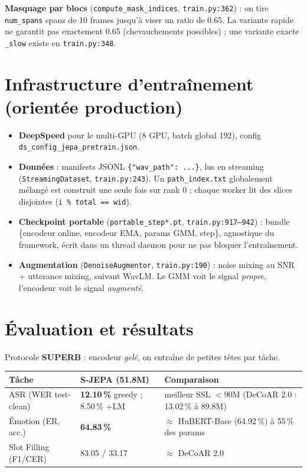 \documentclass[11pt,a4paper]{article}
\newcommand{\code}[1]{\texttt{#1}}
\newcommand{\file}[1]{\texttt{#1}}
\begin{document}
\textbf{Masquage par blocs} (\code{compute\_mask\_indices},
\file{train.py:362}) : on tire \code{num\_spans} spans de 10 frames jusqu'à
viser un ratio de 0.65. La variante rapide ne garantit pas exactement
0.65 (chevauchements possibles) ; une variante exacte \code{\_slow} existe
en \file{train.py:348}.

\section{Infrastructure d'entraînement (orientée production)}

\begin{itemize}[leftmargin=*]
  \item \textbf{DeepSpeed} pour le multi-GPU (8 GPU, batch global 192),
  config \file{ds\_config\_jepa\_pretrain.json}.
  \item \textbf{Données} : manifests JSONL \code{\{"wav\_path": ...\}}, lus en
  streaming (\code{StreamingDataset}, \file{train.py:243}). Un
  \file{path\_index.txt} globalement mélangé est construit une seule fois sur
  rank 0 ; chaque worker lit des slices disjointes (\code{i \% total == wid}).
  \item \textbf{Checkpoint portable} (\file{portable\_step*.pt},
  \file{train.py:917--942}) : bundle \{encodeur online, encodeur EMA, params
  GMM, step\}, agnostique du framework, écrit dans un thread daemon pour ne
  pas bloquer l'entraînement.
  \item \textbf{Augmentation} (\code{DenoiseAugmentor}, \file{train.py:190}) :
  noise mixing au SNR + utterance mixing, suivant WavLM. Le GMM voit le
  signal \emph{propre}, l'encodeur voit le signal \emph{augmenté}.
\end{itemize}

\section{Évaluation et résultats}

Protocole \textbf{SUPERB} : encodeur \emph{gelé}, on entraîne de petites
têtes par tâche.

\begin{center}
\begin{tabular}{@{}lll@{}}
\toprule
\textbf{Tâche} & \textbf{S-JEPA (51.8M)} & \textbf{Comparaison} \\
\midrule
ASR (WER test-clean) & \textbf{12.10\,\%} greedy ; 8.50\,\% +LM
  & meilleur SSL $<$90M (DeCoAR 2.0 : 13.02\,\% à 89.8M) \\
Émotion (ER, acc.)   & \textbf{64.83\,\%}
  & $\approx$ HuBERT-Base (64.92\,\%) à 55\,\% des params \\
Slot Filling (F1/CER) & 83.05 / 33.17
  & $\approx$ DeCoAR 2.0 \\
\bottomrule
\end{tabular}
\end{center}
\end{document}
